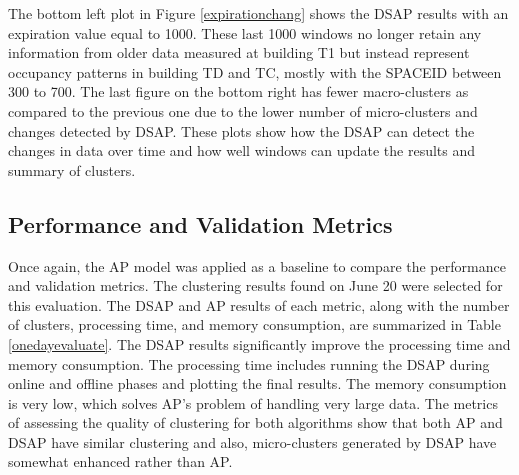 The bottom left plot in Figure \ref{expirationchang} shows the DSAP results with an expiration value equal to 1000. These last 1000 windows no longer retain any information from older data measured at building T1 but instead represent occupancy patterns in building TD and TC, mostly with the SPACEID between 300 to 700. The last figure on the bottom right has fewer macro-clusters as compared to the previous one due to the lower number of micro-clusters and changes detected by DSAP. These plots show how the DSAP can detect the changes in data over time and how well windows can update the results and summary of clusters. 







\subsection{Performance and Validation Metrics}

Once again, the AP model was applied as a baseline to compare the performance and validation metrics. The clustering results found on June 20 were selected for this evaluation. 
The DSAP and AP results of each metric, along with the number of clusters, processing time, and memory consumption, are summarized in Table \ref{onedayevaluate}. The DSAP results significantly improve the processing time and memory consumption. The processing time includes running the DSAP during online and offline phases and plotting the final results.  The memory consumption is very low, which solves AP's problem of handling very large data. The metrics of assessing the quality of clustering for both algorithms show that both AP and DSAP have similar clustering and also, micro-clusters generated by DSAP have somewhat enhanced rather than AP.





